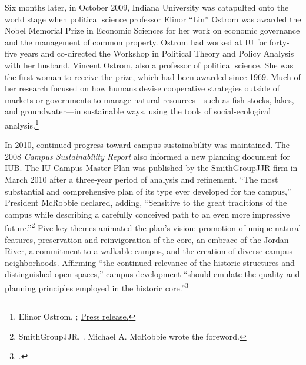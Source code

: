 \documentclass[
  american,
  letterpaper,
]{scrreprt}
\begin{document}
Six months later, in October 2009, Indiana University was catapulted
onto the world stage when political science professor Elinor ``Lin''
Ostrom was awarded the Nobel Memorial Prize in Economic Sciences for her
work on economic governance and the management of common property.
Ostrom had worked at IU for forty-five years and co-directed the
Workshop in Political Theory and Policy Analysis with her husband,
Vincent Ostrom, also a professor of political science. She was the first
woman to receive the prize, which had been awarded since 1969. Much of
her research focused on how humans devise cooperative strategies outside
of markets or governments to manage natural resources---such as fish
stocks, lakes, and groundwater---in sustainable ways, using the tools of
social-ecological analysis.\footnote{Elinor Ostrom,
  ;
  \href{https://www.nobelprize.org/prizes/economic-sciences/2009/press-release/.}{Press
  release.}}

In 2010, continued progress toward campus sustainability was maintained.
The 2008 \emph{Campus Sustainability Report} also informed a new
planning document for IUB. The IU Campus Master Plan was published by
the SmithGroupJJR firm in March 2010 after a three-year period of
analysis and refinement. ``The most substantial and comprehensive plan
of its type ever developed for the campus,'' President McRobbie
declared, adding, ``Sensitive to the great traditions of the campus
while describing a carefully conceived path to an even more impressive
future.''\footnote{SmithGroupJJR,
  . Michael A. McRobbie wrote the
  foreword.} Five key themes animated the plan's vision: promotion of
unique natural features, preservation and reinvigoration of the core, an
embrace of the Jordan River, a commitment to a walkable campus, and the
creation of diverse campus neighborhoods. Affirming ``the continued
relevance of the historic structures and distinguished open spaces,''
campus development ``should emulate the quality and planning principles
employed in the historic core.''\footnote{.}
\end{document}
